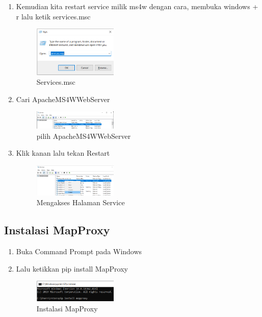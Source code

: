 \begin{enumerate}
  \item Kemudian kita restart service milik ms4w dengan cara, membuka windows + r lalu ketik services.msc
  \hfill\break
    \begin{figure}[H]
		\includegraphics[width=4cm]{figures/tugas4/1174084/7.png}
		\centering
		\caption{Services.msc}
    \end{figure}
    
  \item Cari ApacheMS4WWebServer
  \hfill\break
  \begin{figure}[H]
  \includegraphics[width=4cm]{figures/tugas4/1174084/8.png}
  \centering
  \caption{pilih ApacheMS4WWebServer}
  \end{figure}

  \item Klik kanan lalu tekan Restart
  \hfill\break
    \begin{figure}[H]
		\includegraphics[width=4cm]{figures/tugas4/1174084/9.png}
		\centering
		\caption{Mengakses Halaman Service}
    \end{figure}
\end{enumerate}

\subsection{Instalasi MapProxy}
\begin{enumerate}
  \item Buka Command Prompt pada Windows
  \item Lalu ketikkan pip install MapProxy
  \hfill\break
  \begin{figure}[H]
  \includegraphics[width=4cm]{figures/tugas4/1174084/10.png}
  \centering
  \caption{Instalasi MapProxy}
  \end{figure}
\end{enumerate}

